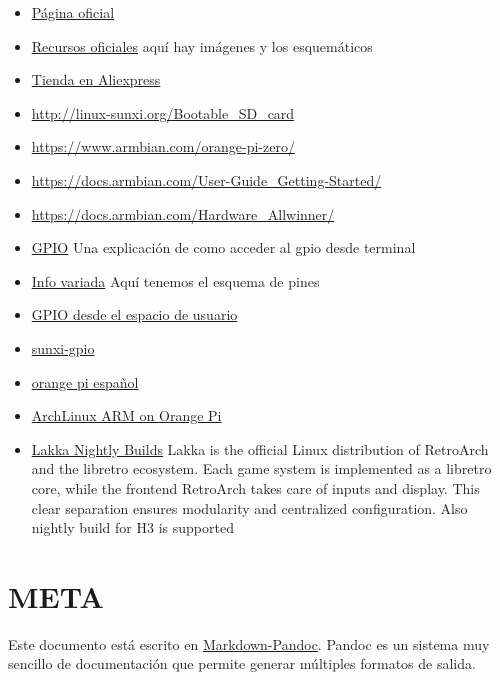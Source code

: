 \documentclass[12pt,spanish,]{scrartcl}
\providecommand{\tightlist}{%
  \setlength{\itemsep}{0pt}\setlength{\parskip}{0pt}}
\begin{document}
\begin{itemize}
\tightlist
\item
  \href{http://www.orangepi.org/}{Página oficial}
\item
  \href{http://www.orangepi.org/downloadresources/}{Recursos oficiales}
  aquí hay imágenes y los esquemáticos
\item
  \href{https://www.aliexpress.com/store/1553371?spm=2114.8147860.0.0.F1q43C}{Tienda
  en Aliexpress}
\item
  \url{http://linux-sunxi.org/Bootable_SD_card}
\item
  \url{https://www.armbian.com/orange-pi-zero/}
\item
  \url{https://docs.armbian.com/User-Guide_Getting-Started/}
\item
  \url{https://docs.armbian.com/Hardware_Allwinner/}
\item
  \href{https://linux-sunxi.org/GPIO}{GPIO} Una explicación de como
  acceder al gpio desde terminal
\item
  \href{https://linux-sunxi.org/Orange_Pi_Zero}{Info variada} Aquí
  tenemos el esquema de pines
\item
  \href{https://forum.armbian.com/index.php/topic/1886-gpio-access-from-user-space/}{GPIO
  desde el espacio de usuario}
\item
  \href{https://forum.armbian.com/index.php/topic/1471-solved-difficulty-accessing-gpio-via-the-sunxi-gpio-export-interface/}{sunxi-gpio}
\item
  \href{http://orangepiweb.es/index.php}{orange pi español}
\item
  \href{https://www.amedeobaragiola.me/blog/2016/06/04/archlinux-arm-on-orange-pi-one/}{ArchLinux
  ARM on Orange Pi}
\item
  \href{http://mirror.lakka.tv/nightly/}{Lakka Nightly Builds} Lakka is
  the official Linux distribution of RetroArch and the libretro
  ecosystem. Each game system is implemented as a libretro core, while
  the frontend RetroArch takes care of inputs and display. This clear
  separation ensures modularity and centralized configuration. Also
  nightly build for H3 is supported
\end{itemize}

\hypertarget{meta}{%
\section{META}\label{meta}}

Este documento está escrito en
\href{http://pandoc.org/README.html}{Markdown-Pandoc}. Pandoc es un
sistema muy sencillo de documentación que permite generar múltiples
formatos de salida.
\end{document}
